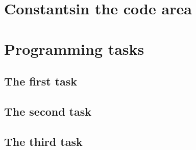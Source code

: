 \documentclass[english]{article}
\begin{document}
\section{Constantsin the code area}

\section{Programming tasks}

\subsection{The first task}

\subsection{The second task}

\subsection{The third task}
\end{document}
